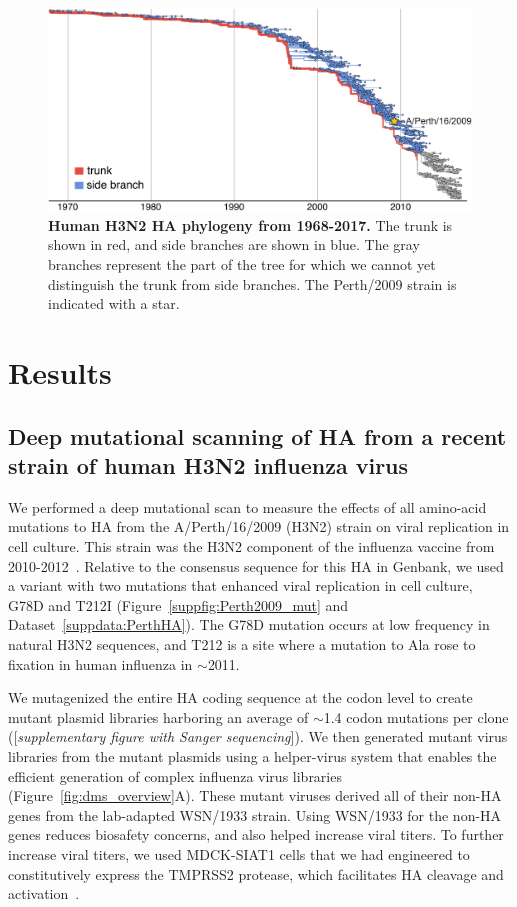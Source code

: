 \documentclass[9pt,twocolumn,twoside]{pnas-new}
\newcommand{\comment}[1]{{\color{red}[\textsl{#1}]}}
\begin{document}
\begin{figure}
\centering
\includegraphics[width=11.4cm]{figs/H3N2_phylogeny/H3N2_phylogeny.pdf}
\caption{\label{fig:H3N2_phylogeny}
{\bf Human H3N2 HA phylogeny from 1968-2017.}
The trunk is shown in red, and side branches are shown in blue.
The gray branches represent the part of the tree for which we cannot yet distinguish the trunk from side branches.
The Perth/2009 strain is indicated with a star.
}
\end{figure}


 

\section*{Results}
\label{sec:results}

\subsection*{Deep mutational scanning of HA from a recent strain of human H3N2 influenza virus}
We performed a deep mutational scan to measure the effects of all amino-acid mutations to HA from the A/Perth/16/2009 (H3N2) strain on viral replication in cell culture. 
This strain was the H3N2 component of the influenza vaccine from 2010-2012~\cite{who2010d,who2011}.
Relative to the consensus sequence for this HA in Genbank, we used a variant with two mutations that enhanced viral replication in cell culture, G78D and T212I (Figure~\ref{suppfig:Perth2009_mut} and Dataset~\ref{suppdata:PerthHA}).
The G78D mutation occurs at low frequency in natural H3N2 sequences, and T212 is a site where a mutation to Ala rose to fixation in human influenza in $\sim$2011.

We mutagenized the entire HA coding sequence at the codon level to create mutant plasmid libraries harboring an average of $\sim$1.4 codon mutations per clone (\comment{supplementary figure with Sanger sequencing}).
We then generated mutant virus libraries from the mutant plasmids using a helper-virus system that enables the efficient generation of complex influenza virus libraries~\cite{doud2016accurate} (Figure~\ref{fig:dms_overview}A).
These mutant viruses derived all of their non-HA genes from the lab-adapted WSN/1933 strain.
Using WSN/1933 for the non-HA genes reduces biosafety concerns, and also helped increase viral titers.
To further increase viral titers, we used MDCK-SIAT1 cells that we had engineered to constitutively express the TMPRSS2 protease, which facilitates HA cleavage and activation~\cite{bottcher2006proteolytic, bottcher2010cleavage}.
\end{document}
